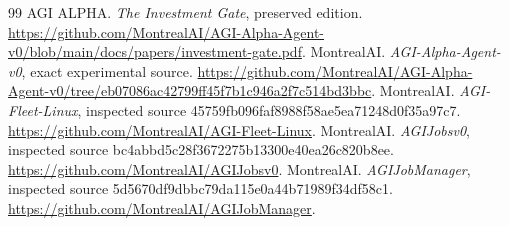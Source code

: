 \documentclass[11pt,letterpaper]{article}
\begin{document}
\begin{thebibliography}{99}
 AGI ALPHA. \emph{The Investment Gate}, preserved edition. \url{https://github.com/MontrealAI/AGI-Alpha-Agent-v0/blob/main/docs/papers/investment-gate.pdf}.
 MontrealAI. \emph{AGI-Alpha-Agent-v0}, exact experimental source. \url{https://github.com/MontrealAI/AGI-Alpha-Agent-v0/tree/eb07086ac42799ff45f7b1c946a2f7c514bd3bbc}.
 MontrealAI. \emph{AGI-Fleet-Linux}, inspected source 45759fb096faf8988f58ae5ea71248d0f35a97c7. \url{https://github.com/MontrealAI/AGI-Fleet-Linux}.
 MontrealAI. \emph{AGIJobsv0}, inspected source bc4abbd5c28f3672275b13300e40ea26c820b8ee. \url{https://github.com/MontrealAI/AGIJobsv0}.
 MontrealAI. \emph{AGIJobManager}, inspected source 5d5670df9dbbc79da115e0a44b71989f34df58c1. \url{https://github.com/MontrealAI/AGIJobManager}.
\end{thebibliography}
\end{document}
